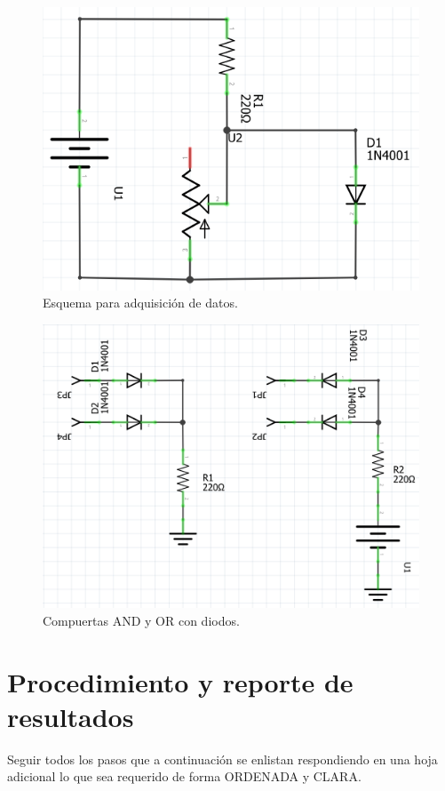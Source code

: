 \documentclass[letterpaper, 12 pt, conference]{ieeeconf}  %
\begin{document}
\begin{figure}[h!]
    \centering
    \includegraphics[scale=0.5]{C1.png}
    \caption{Esquema para adquisición de datos.}
\end{figure}

\begin{figure}[h!]
    \centering
    \includegraphics[scale=0.65]{C2.png}
    \caption{Compuertas AND y OR con diodos.}
\end{figure}

\section{Procedimiento y reporte de resultados}
Seguir todos los pasos que a continuación se enlistan respondiendo en una hoja adicional lo que sea requerido de forma ORDENADA y CLARA.
\end{document}

